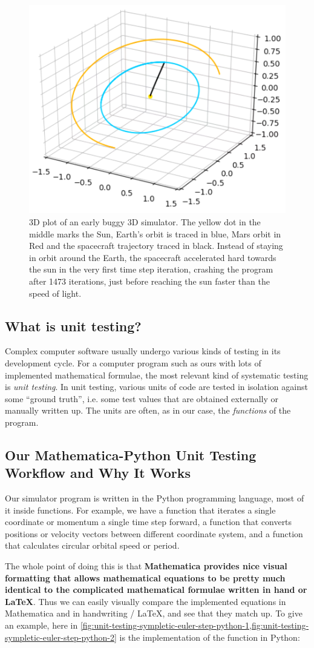\begin{figure}[H]
    \centering
    \includegraphics[width=0.50\linewidth]{fig/r4b-bug.png}
    \caption{3D plot of an early buggy 3D simulator. The yellow dot in the middle marks the Sun, Earth's orbit is traced in blue, Mars orbit in Red and the spacecraft trajectory traced in black. Instead of staying in orbit around the Earth, the spacecraft accelerated hard towards the sun in the very first time step iteration, crashing the program after 1473 iterations, just before reaching the sun faster than the speed of light.}
    \label{fig:r4b-bug}
\end{figure}

\subsection{What is unit testing?}
Complex computer software usually undergo various kinds of testing in its development cycle. For a computer program such as ours with lots of implemented mathematical formulae, the most relevant kind of systematic testing is \emph{unit testing}. In unit testing, various units of code are tested in isolation against some ``ground truth'', i.e. some test values that are obtained externally or manually written up. The units are often, as in our case, the \emph{functions} of the program. 

\subsection{Our Mathematica-Python Unit Testing Workflow and Why It Works}
Our simulator program is written in the Python programming language, most of it inside functions. For example, we have a function that iterates a single coordinate or momentum a single time step forward, a function that converts positions or velocity vectors between different coordinate system, and a function that calculates circular orbital speed or period.

The whole point of doing this is that \textbf{Mathematica provides nice visual formatting that allows mathematical equations to be pretty much identical to the complicated mathematical formulae written in hand or LaTeX}. Thus we can easily visually compare the implemented equations in Mathematica and in handwriting / LaTeX, and see that they match up. To give an example, here in \cref{fig:unit-testing-sympletic-euler-step-python-1,fig:unit-testing-sympletic-euler-step-python-2} is the implementation of the \texttt{} function in Python:

